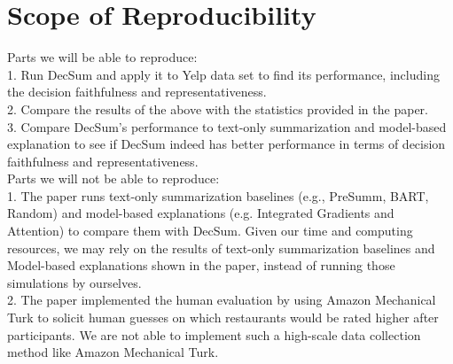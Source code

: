 \documentclass{article}
\begin{document}
\section{Scope of Reproducibility}
Parts we will be able to reproduce: \\
1.  Run DecSum and apply it to Yelp data set to find its performance, including the decision faithfulness and representativeness. \\
2. Compare the results of the above with the statistics provided in the paper. \\
3. Compare DecSum’s performance to text-only summarization and model-based explanation to see if DecSum indeed has better performance in terms of decision faithfulness and representativeness. \\

Parts we will not be able to reproduce: \\
1. The paper runs text-only summarization baselines (e.g., PreSumm, BART, Random) and model-based explanations (e.g. Integrated Gradients and Attention) to compare them with DecSum.
Given our time and computing resources, we may rely on the results of text-only summarization baselines and Model-based explanations shown in the paper, instead of running those simulations by ourselves. \\
2. The paper implemented the human evaluation by using Amazon Mechanical Turk to solicit human guesses on which restaurants would be rated higher after participants. We are not able to implement such
a high-scale data collection method like Amazon Mechanical Turk.
\end{document}
